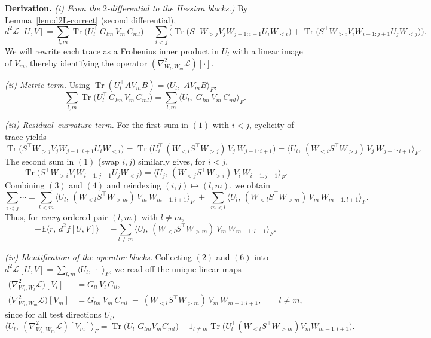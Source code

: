 \documentclass{article}
\theoremstyle{definition}
\begin{document}
\noindent\textbf{Derivation.}
\emph{(i) From the $2$-differential to the Hessian blocks.)}
By Lemma~\ref{lem:d2L-correct} (second differential),
\[
d^2\mathcal L[U,V]
=\sum_{l,m}\operatorname{Tr}\!\big(U_l^\top\,G_{lm}\,V_m\,C_{ml}\big)
-\sum_{i<j}\Big(
\operatorname{Tr}\!\big(S^\top W_{>j}V_jW_{j-1:i+1}U_iW_{<i}\big)
+\operatorname{Tr}\!\big(S^\top W_{>i}V_iW_{i-1:j+1}U_jW_{<j}\big)\Big).
\tag{1}
\]
We will rewrite each trace as a Frobenius inner product in $U_l$ with a linear image of $V_m$, thereby identifying the operator $(\nabla^2_{W_l,W_m}\mathcal L)[\cdot]$.

\smallskip
\emph{(ii) Metric term.}
Using $\operatorname{Tr}(U_l^\top A V_m B)=\langle U_l,\;A V_m B\rangle_F$,
\[
\sum_{l,m}\operatorname{Tr}\!\big(U_l^\top\,G_{lm}\,V_m\,C_{ml}\big)
= \sum_{l,m}\big\langle U_l,\;G_{lm}\,V_m\,C_{ml}\big\rangle_F.
\tag{2}
\]

\smallskip
\emph{(iii) Residual--curvature term.}
For the first sum in \((1)\) with $i<j$, cyclicity of trace yields
\[
\operatorname{Tr}\!\big(S^\top W_{>j}V_jW_{j-1:i+1}U_iW_{<i}\big)
= \operatorname{Tr}\!\big(U_i^\top\,(W_{<i}S^\top W_{>j})\,V_j\,W_{j-1:i+1}\big)
= \big\langle U_i,\,(W_{<i}S^\top W_{>j})\,V_j\,W_{j-1:i+1}\big\rangle_F.
\tag{3}
\]
The second sum in \((1)\) (swap $i,j$) similarly gives, for $i<j$,
\[
\operatorname{Tr}\!\big(S^\top W_{>i}V_iW_{i-1:j+1}U_jW_{<j}\big)
= \big\langle U_j,\,(W_{<j}S^\top W_{>i})\,V_i\,W_{i-1:j+1}\big\rangle_F.
\tag{4}
\]
Combining \((3)\) and \((4)\) and reindexing $(i,j)\mapsto(l,m)$, we obtain
\[
\sum_{i<j}\cdots
= \sum_{l<m}\big\langle U_l,\,(W_{<l}S^\top W_{>m})\,V_m\,W_{m-1:l+1}\big\rangle_F
\;+\;\sum_{m<l}\big\langle U_l,\,(W_{<l}S^\top W_{>m})\,V_m\,W_{m-1:l+1}\big\rangle_F.
\tag{5}
\]
Thus, for \emph{every} ordered pair $(l,m)$ with $l\neq m$,
\[
-\mathbb{E}\langle r,\,d^2 f[U,V]\rangle
= -\sum_{l\neq m}\big\langle U_l,\,(W_{<l}S^\top W_{>m})\,V_m\,W_{m-1:l+1}\big\rangle_F.
\tag{6}
\]

\smallskip
\emph{(iv) Identification of the operator blocks.}
Collecting \((2)\) and \((6)\) into \(d^2\mathcal L[U,V]=\sum_{l,m}\langle U_l,\;\cdot\;\rangle_F\), we read off the unique linear maps
\[
\boxed{
\begin{aligned}
\big(\nabla^2_{W_l,W_l}\mathcal L\big)[V_l]
&= G_{ll}\,V_l\,C_{ll},\\
\big(\nabla^2_{W_l,W_m}\mathcal L\big)[V_m]
&= G_{lm}\,V_m\,C_{ml} \;-\; (W_{<l}S^\top W_{>m})\,V_m\,W_{m-1:l+1},\qquad l\neq m,
\end{aligned}}
\]
since for all test directions $U_l$,
\[
\langle U_l,\ (\nabla^2_{W_l,W_m}\mathcal L)[V_m]\rangle_F
= \operatorname{Tr}\!\big(U_l^\top G_{lm}V_m C_{ml}\big)
- 1_{l\neq m}\operatorname{Tr}\!\big(U_l^\top (W_{<l}S^\top W_{>m})V_m W_{m-1:l+1}\big).
\]
\end{document}
